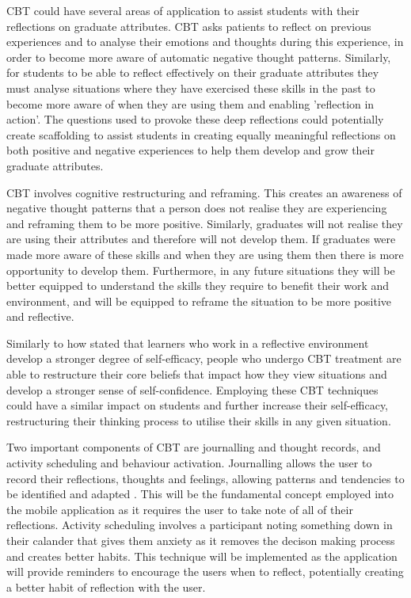 \documentclass{l4proj}
\begin{document}
CBT could have several areas of application to assist students with their reflections on graduate attributes. CBT asks patients to reflect on previous experiences and to analyse their emotions and thoughts during this experience, in order to become more aware of automatic negative thought patterns. Similarly, for students to be able to reflect effectively on their graduate attributes they must analyse situations where they have exercised these skills in the past to become more aware of when they are using them and enabling 'reflection in action'. The questions used to provoke these deep reflections could potentially create scaffolding to assist students in creating equally meaningful reflections on both positive and negative experiences to help them develop and grow their graduate attributes.

CBT involves cognitive restructuring and reframing. This creates an awareness of negative thought patterns that a person does not realise they are experiencing and reframing them to be more positive. Similarly, graduates will not realise they are using their attributes and therefore will not develop them. If graduates were made more aware of these skills and when they are using them then there is more opportunity to develop them. Furthermore, in any future situations they will be better equipped to understand the skills they require to benefit their work and environment, and will be equipped to reframe the situation to be more positive and reflective.

Similarly to how \citet{bruno_reflective_2018} stated that learners who work in a reflective environment develop a stronger degree of self-efficacy, people who undergo CBT treatment are able to restructure their core beliefs that impact how they view situations and develop a stronger sense of self-confidence. Employing these CBT techniques could have a similar impact on students and further increase their self-efficacy, restructuring their thinking process to utilise their skills in any given situation. 

Two important components of CBT are journalling and thought records, and activity scheduling and behaviour activation. Journalling allows the user to record their reflections, thoughts and feelings, allowing patterns and tendencies to be identified and adapted \citep{ackerman_cbt_2017}. This will be the fundamental concept employed into the mobile application as it requires the user to take note of all of their reflections. Activity scheduling involves a participant noting something down in their calander that gives them anxiety as it removes the decison making process and creates better habits. This technique will be implemented as the application will provide reminders to encourage the users when to reflect, potentially creating a better habit of reflection with the user.
\end{document}
